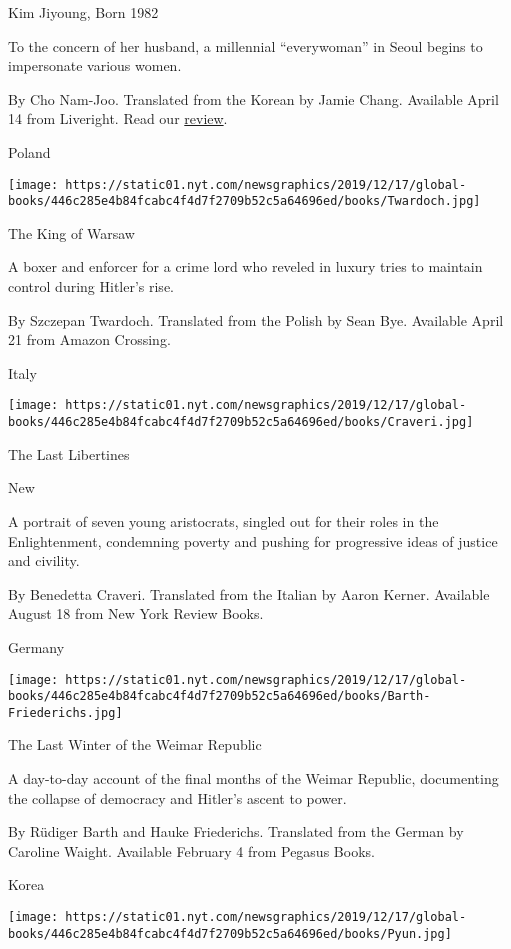 Kim Jiyoung, Born 1982

To the concern of her husband, a millennial ``everywoman'' in Seoul
begins to impersonate various women.

 By Cho Nam-Joo. Translated from the Korean by Jamie Chang. Available
April 14 from Liveright. Read our
\href{https://www.nytimes.com/2020/04/14/books/review/kim-jiyoung-born-1982-cho-nam-joo.html}{review}.

Poland

\texttt{[image: https://static01.nyt.com/newsgraphics/2019/12/17/global-books/446c285e4b84fcabc4f4d7f2709b52c5a64696ed/books/Twardoch.jpg]}

The King of Warsaw

A boxer and enforcer for a crime lord who reveled in luxury tries to
maintain control during Hitler's rise.

 By Szczepan Twardoch. Translated from the Polish by Sean Bye. Available
April 21 from Amazon Crossing.

Italy

\texttt{[image: https://static01.nyt.com/newsgraphics/2019/12/17/global-books/446c285e4b84fcabc4f4d7f2709b52c5a64696ed/books/Craveri.jpg]}

The Last Libertines

New

A portrait of seven young aristocrats, singled out for their roles in
the Enlightenment, condemning poverty and pushing for progressive ideas
of justice and civility.

 By Benedetta Craveri. Translated from the Italian by Aaron Kerner.
Available August 18 from New York Review Books.

Germany

\texttt{[image: https://static01.nyt.com/newsgraphics/2019/12/17/global-books/446c285e4b84fcabc4f4d7f2709b52c5a64696ed/books/Barth-Friederichs.jpg]}

The Last Winter of the Weimar Republic

A day-to-day account of the final months of the Weimar Republic,
documenting the collapse of democracy and Hitler's ascent to power.

 By Rüdiger Barth and Hauke Friederichs. Translated from the German by
Caroline Waight. Available February 4 from Pegasus Books.

Korea

\texttt{[image: https://static01.nyt.com/newsgraphics/2019/12/17/global-books/446c285e4b84fcabc4f4d7f2709b52c5a64696ed/books/Pyun.jpg]}

